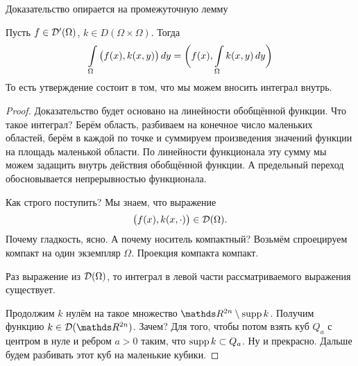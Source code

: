 \begin{Proof}
Доказательство опирается на промежуточную лемму
\begin{Lem}
  Пусть $f\in \mathcal D'(\Omega)$, $k\in D(\Omega\times \Omega)$. Тогда
\[
  \int\limits_{\Omega} \big(f(x),k(x,y)\big)\,dy = 
  \bigg(f(x),\int\limits_{\Omega} k(x,y)\,dy\bigg)
\]
То есть утверждение состоит в том, что мы можем вносить интеграл внутрь.
\end{Lem}

\begin{proof}
  Доказательство будет основано на линейности обобщённой функции. Что такое интеграл? Берём область, разбиваем на конечное число маленьких областей, берём в каждой по точке и суммируем произведения значений функции на площадь маленькой области. По линейности функционала эту сумму мы можем задащить внутрь действия обобщённой функции. А предельный переход обосновывается непрерывностью функционала.

Как строго поступить? Мы знаем, что выражение
\[
  \big(f(x),k(x,\cdot)\big)\in \mathcal D(\Omega).
\]
Почему гладкость, ясно. А почему носитель компактный? Возьмём спроецируем компакт на один экземпляр $\Omega$. Проекция компакта компакт.

Раз выражение из $\mathcal D(\Omega)$, то интеграл в левой части рассматриваемого выражения существует.

Продолжим $k$ нулём на такое множество $\R^{2n}\dd\supp k$. Получим функцию $k\in \D(\R^{2n})$. Зачем? Для того, чтобы потом взять куб $Q_a$ с центром в нуле и ребром $a>0$ таким, что $\operatorname{supp} k\subset Q_a$. Ну и прекрасно. Дальше будем разбивать этот куб на маленькие кубики.


\end{proof}
\end{Proof}
